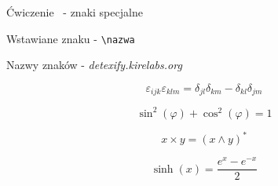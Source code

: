\documentclass{beamer}
\theoremstyle{newblock}
\begin{document}
\begin{frame}[fragile]{Ćwiczenie \showmycounter \ - znaki specjalne}

    \centering
    Wstawiane znaku - \verb|\nazwa|

    Nazwy znaków - \textit{detexify.kirelabs.org}

    \begin{examples}
        \begin{equation}
            \varepsilon_{ijk} \varepsilon_{klm} = \delta_{jl}\delta_{km} - \delta_{kl}\delta_{jm}
        \end{equation}
    \end{examples}

    \begin{examples}
        \begin{equation}
            \sin ^2 (\varphi) + \cos^2 (\varphi) = 1
        \end{equation}
    \end{examples}

    \begin{examples}
        \begin{equation}
            x \times y = (x \wedge y)^*
        \end{equation}
    \end{examples}

    \begin{examples}

        \begin{equation}
            \sinh(x) = \frac{e^x - e^{-x}}{2}
        \end{equation}
    \end{examples}
\end{frame}
\end{document}
